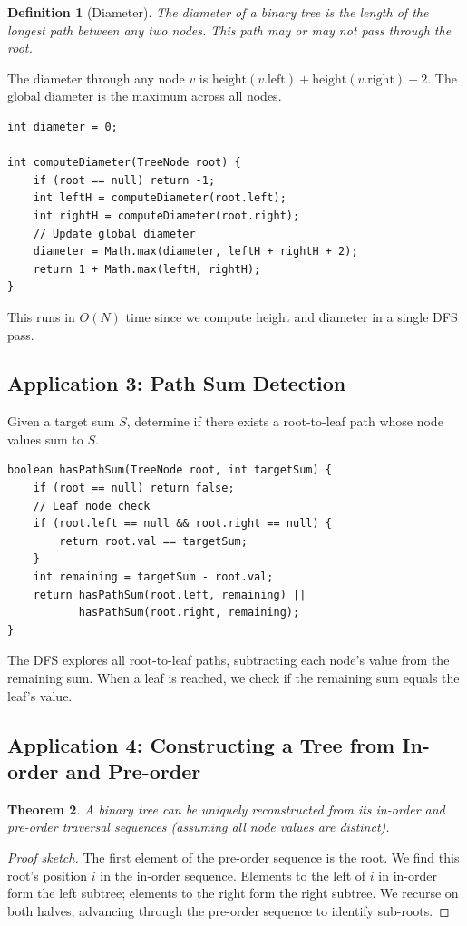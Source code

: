 \documentclass[10pt,journal,compsoc,onecolumn]{IEEEtran}
\newtheorem{theorem}{Theorem}
\newtheorem{definition}[theorem]{Definition}
\begin{document}
\begin{definition}[Diameter]
The \emph{diameter} of a binary tree is the length of the longest path between any two nodes. This path may or may not pass through the root.
\end{definition}

The diameter through any node $v$ is $\text{height}(v.\text{left}) + \text{height}(v.\text{right}) + 2$. The global diameter is the maximum across all nodes.

\begin{verbatim}
int diameter = 0;

int computeDiameter(TreeNode root) {
    if (root == null) return -1;
    int leftH = computeDiameter(root.left);
    int rightH = computeDiameter(root.right);
    // Update global diameter
    diameter = Math.max(diameter, leftH + rightH + 2);
    return 1 + Math.max(leftH, rightH);
}
\end{verbatim}

This runs in $O(N)$ time since we compute height and diameter in a single DFS pass.

\subsection{Application 3: Path Sum Detection}

Given a target sum $S$, determine if there exists a root-to-leaf path whose node values sum to $S$.

\begin{verbatim}
boolean hasPathSum(TreeNode root, int targetSum) {
    if (root == null) return false;
    // Leaf node check
    if (root.left == null && root.right == null) {
        return root.val == targetSum;
    }
    int remaining = targetSum - root.val;
    return hasPathSum(root.left, remaining) ||
           hasPathSum(root.right, remaining);
}
\end{verbatim}

The DFS explores all root-to-leaf paths, subtracting each node's value from the remaining sum. When a leaf is reached, we check if the remaining sum equals the leaf's value.

\subsection{Application 4: Constructing a Tree from In-order and Pre-order}

\begin{theorem}
A binary tree can be uniquely reconstructed from its in-order and pre-order traversal sequences (assuming all node values are distinct).
\end{theorem}
\begin{proof}[Proof sketch]
The first element of the pre-order sequence is the root. We find this root's position $i$ in the in-order sequence. Elements to the left of $i$ in in-order form the left subtree; elements to the right form the right subtree. We recurse on both halves, advancing through the pre-order sequence to identify sub-roots.
\end{proof}
\end{document}
